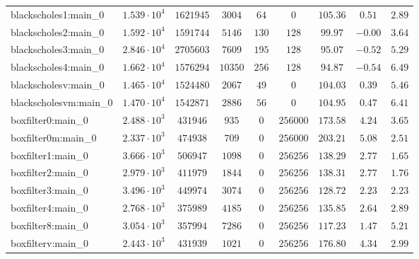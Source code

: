 \begin{tabular}{|l|c|c|c|c|c|c|c|c|}
blackscholes1:main\_0          & $ 1.539 \cdot 10^{4} $ & $ 1621945  $ & $ 3004   $ & $ 64   $ & $ 0        $ & $ 105.36      $ & $ 0.51    $ & $ 2.89    $ \\
blackscholes2:main\_0          & $ 1.592 \cdot 10^{4} $ & $ 1591744  $ & $ 5146   $ & $ 130  $ & $ 128      $ & $ 99.97       $ & $ -0.00   $ & $ 3.64    $ \\
blackscholes3:main\_0          & $ 2.846 \cdot 10^{4} $ & $ 2705603  $ & $ 7609   $ & $ 195  $ & $ 128      $ & $ 95.07       $ & $ -0.52   $ & $ 5.29    $ \\
blackscholes4:main\_0          & $ 1.662 \cdot 10^{4} $ & $ 1576294  $ & $ 10350  $ & $ 256  $ & $ 128      $ & $ 94.87       $ & $ -0.54   $ & $ 6.49    $ \\
blackscholesv:main\_0          & $ 1.465 \cdot 10^{4} $ & $ 1524480  $ & $ 2067   $ & $ 49   $ & $ 0        $ & $ 104.03      $ & $ 0.39    $ & $ 5.46    $ \\
blackscholesvm:main\_0         & $ 1.470 \cdot 10^{4} $ & $ 1542871  $ & $ 2886   $ & $ 56   $ & $ 0        $ & $ 104.95      $ & $ 0.47    $ & $ 6.41    $ \\
boxfilter0:main\_0             & $ 2.488 \cdot 10^{3} $ & $ 431946   $ & $ 935    $ & $ 0    $ & $ 256000   $ & $ 173.58      $ & $ 4.24    $ & $ 3.65    $ \\
boxfilter0m:main\_0            & $ 2.337 \cdot 10^{3} $ & $ 474938   $ & $ 709    $ & $ 0    $ & $ 256000   $ & $ 203.21      $ & $ 5.08    $ & $ 2.51    $ \\
boxfilter1:main\_0             & $ 3.666 \cdot 10^{3} $ & $ 506947   $ & $ 1098   $ & $ 0    $ & $ 256256   $ & $ 138.29      $ & $ 2.77    $ & $ 1.65    $ \\
boxfilter2:main\_0             & $ 2.979 \cdot 10^{3} $ & $ 411979   $ & $ 1844   $ & $ 0    $ & $ 256256   $ & $ 138.31      $ & $ 2.77    $ & $ 1.76    $ \\
boxfilter3:main\_0             & $ 3.496 \cdot 10^{3} $ & $ 449974   $ & $ 3074   $ & $ 0    $ & $ 256256   $ & $ 128.72      $ & $ 2.23    $ & $ 2.23    $ \\
boxfilter4:main\_0             & $ 2.768 \cdot 10^{3} $ & $ 375989   $ & $ 4185   $ & $ 0    $ & $ 256256   $ & $ 135.85      $ & $ 2.64    $ & $ 2.89    $ \\
boxfilter8:main\_0             & $ 3.054 \cdot 10^{3} $ & $ 357994   $ & $ 7286   $ & $ 0    $ & $ 256256   $ & $ 117.23      $ & $ 1.47    $ & $ 5.21    $ \\
boxfilterv:main\_0             & $ 2.443 \cdot 10^{3} $ & $ 431939   $ & $ 1021   $ & $ 0    $ & $ 256256   $ & $ 176.80      $ & $ 4.34    $ & $ 2.99    $ \\

\end{tabular}
